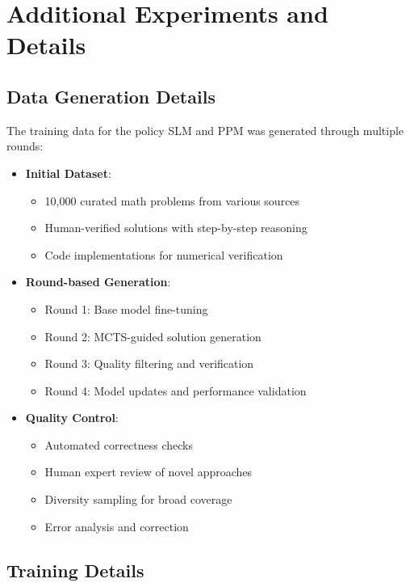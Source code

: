 \appendix

\section{Additional Experiments and Details}
\label{sec:appendexp}

\subsection{Data Generation Details}

The training data for the policy SLM and PPM was generated through multiple rounds:

\begin{itemize}
    \item \textbf{Initial Dataset}:
    \begin{itemize}
        \item 10,000 curated math problems from various sources
        \item Human-verified solutions with step-by-step reasoning
        \item Code implementations for numerical verification
    \end{itemize}

    \item \textbf{Round-based Generation}:
    \begin{itemize}
        \item Round 1: Base model fine-tuning
        \item Round 2: MCTS-guided solution generation
        \item Round 3: Quality filtering and verification
        \item Round 4: Model updates and performance validation
    \end{itemize}

    \item \textbf{Quality Control}:
    \begin{itemize}
        \item Automated correctness checks
        \item Human expert review of novel approaches
        \item Diversity sampling for broad coverage
        \item Error analysis and correction
    \end{itemize}
\end{itemize}

\subsection{Training Details}


